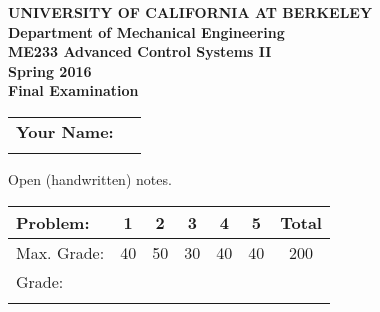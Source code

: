 \documentclass[letterpaper,12pt]{article}
\begin{document}
\begin{center}
    {\bf UNIVERSITY OF CALIFORNIA AT BERKELEY}\\
    {\bf Department of Mechanical Engineering}\\
    {\bf ME233  Advanced Control Systems II\\
    Spring 2016} \\ \vspace{2ex}
    {\Large \bf{ Final Examination }}
\end{center}

\begin{tabular}{|l l|}
    \hline
    {\bf Your Name:} & \hspace{4in}$\:$\\
    $\:$ & $\:$\\
    \hline
\end{tabular}

$\:$\\

\noindent
Open (handwritten) notes.\\

\begin{tabular}{|l | c | c | c | c | c | c | }
    \hline
    Problem: & 1 & 2 & 3 & 4 & 5 & Total \\ \hline
    Max. Grade: & 40 & 50 & 30 & 40 & 40 & 200 \\ \hline
    Grade: & \hspace{.5in} &\hspace{.5in} &\hspace{.5in} &\hspace{.5in} &\hspace{.5in} &\hspace{.5in} \\
    & & & & & & \\
    \hline
\end{tabular}



\newpage $\,$ \newpage

\newpage $\,$ \newpage

\newpage $\,$ \newpage

\newpage $\,$ \newpage

\newpage $\,$ \newpage
%
\end{document}
